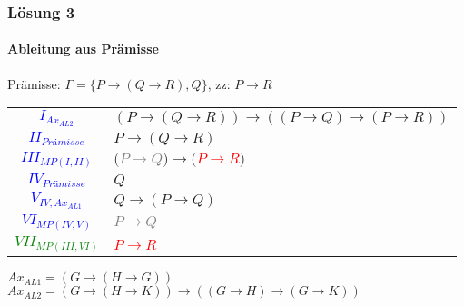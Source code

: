 \documentclass{beamer}
\begin{document}
	\begin{frame}
		\frametitle{Lösung 3}
		\framesubtitle{Ableitung aus Prämisse}
		Prämisse: $\Gamma =\{P\rightarrow(Q\rightarrow R), Q\}$, zz: $P\rightarrow R$\\
		\begin{tabular}{cl}
			\textcolor{blue}{$I_{Ax_{AL2}}$} & $(P\rightarrow(Q\rightarrow R))\rightarrow((P\rightarrow Q)\rightarrow(P\rightarrow R))$\\
			\textcolor{blue}{$II_{Prämisse}$} & $P\rightarrow(Q\rightarrow R)$\\
			\textcolor{blue}{$III_{MP(I, II)}$} & $($\textcolor{gray}{$P\rightarrow Q$}$)\rightarrow($\textcolor{red}{$P\rightarrow R$}$)$\\
			\textcolor{blue}{$IV_{Prämisse}$} & $Q$\\
			\textcolor{blue}{$V_{IV, Ax_{AL1}}$} & $Q\rightarrow(P\rightarrow Q)$\\
			\textcolor{blue}{$VI_{MP(IV, V)}$} & \textcolor{gray}{$P\rightarrow Q$}\\
			\textcolor{green}{$VII_{MP(III, VI)}$} & \textcolor{red}{$P\rightarrow R$}\\
		\end{tabular}
		$Ax_{AL1} = (G\rightarrow(H\rightarrow G))$\\
		$Ax_{AL2} = (G\rightarrow(H\rightarrow K))\rightarrow((G\rightarrow H)\rightarrow(G\rightarrow K))$\\
	\end{frame}
\end{document}
